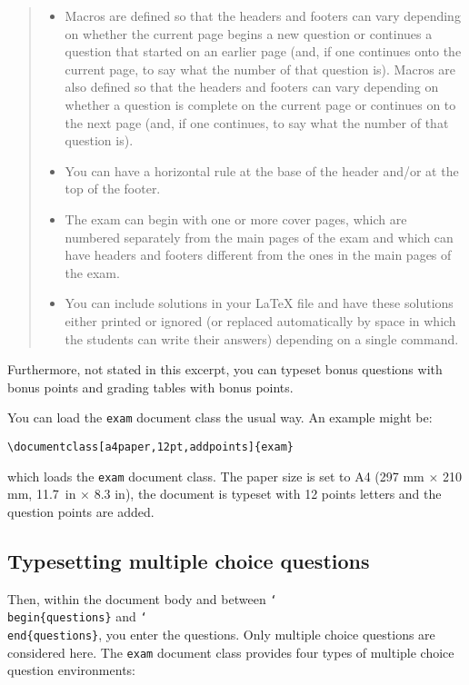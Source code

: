 \documentclass[12pt,a4paper]{exam}
\providecommand{\texorpdfstring}[2]{#1}
\newcommand{\bs}{\texorpdfstring{\char`\\}{}}
\begin{document}
\begin{quote}
\begin{itemize}
\item Macros are defined so that the headers and footers can vary
  depending on whether the current page begins a new question or
  continues a question that started on an earlier page (and, if one
  continues onto the current page, to say what the number of that
  question is).  Macros are also defined so that the headers and
  footers can vary depending on whether a question is complete on the
  current page or continues on to the next page (and, if one
  continues, to say what the number of that question is).
\item You can have a horizontal rule at the base of the header and/or
  at the top of the footer.
\item The exam can begin with one or more cover pages, which are
  numbered separately from the main pages of the exam and which can
  have headers and footers different from the ones in the main pages
  of the exam.
\item You can include solutions in your \LaTeX{} file and have these
  solutions either printed or ignored (or replaced automatically by
  space in which the students can write their answers) depending on a
  single command.
\end{itemize}
\end{quote}

Furthermore, not stated in this excerpt, you can typeset bonus questions
with bonus points and grading tables with bonus points.

You can load the \texttt{exam} document class the usual way. An example
might be:

\begin{lstlisting}
\documentclass[a4paper,12pt,addpoints]{exam}
\end{lstlisting}

which loads the \texttt{exam} document class. The paper size is set to
A4 (297 mm $\times$ 210 mm, 11.7~in $\times$ 8.3 in), the document is
typeset with 12 points letters and the question points are added.


\subsection{Typesetting multiple choice questions}
Then, within the document body and between \texttt{\bs begin\{questions\}} and
\texttt{\bs end\{questions\}}, you enter the questions. Only multiple choice
questions are considered here. The \texttt{exam} document class provides four types
of multiple choice question environments:
\end{document}
